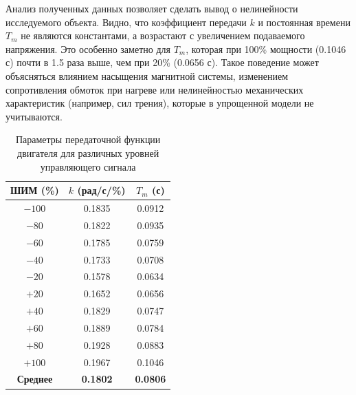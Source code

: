 \documentclass[a4paper, 12pt]{article}
\begin{document}
    Анализ полученных данных позволяет сделать вывод о нелинейности исследуемого объекта. Видно, что коэффициент передачи \(k\) и постоянная времени \(T_m\) не являются константами, а возрастают с увеличением подаваемого напряжения. Это особенно заметно для \(T_m\), которая при 100\% мощности (0.1046 с) почти в 1.5 раза выше, чем при 20\% (0.0656 с). Такое поведение может объясняться влиянием насыщения магнитной системы, изменением сопротивления обмоток при нагреве или нелинейностью механических характеристик (например, сил трения), которые в упрощенной модели не учитываются.
    \begin{table}[H]
        \centering
        \caption{Параметры передаточной функции двигателя для различных уровней управляющего сигнала}
        \label{tab:parameters_identification}
        \begin{tabular}{|c|c|c|}
            \hline
            \textbf{ШИМ (\%)} & \textbf{$k$ (рад/с/\%)} & \textbf{$T_m$ (с)} \\
            \hline
            $-100$            & 0.1835                  & 0.0912             \\
            $-80$             & 0.1822                  & 0.0935             \\
            $-60$             & 0.1785                  & 0.0759             \\
            $-40$             & 0.1733                  & 0.0708             \\
            $-20$             & 0.1578                  & 0.0634             \\
            \hline
            $+20$             & 0.1652                  & 0.0656             \\
            $+40$             & 0.1829                  & 0.0747             \\
            $+60$             & 0.1889                  & 0.0784             \\
            $+80$             & 0.1928                  & 0.0883             \\
            $+100$            & 0.1967                  & 0.1046             \\
            \hline
            \textbf{Среднее}  & \textbf{0.1802}         & \textbf{0.0806}    \\
            \hline
        \end{tabular}
    \end{table}
\end{document}
